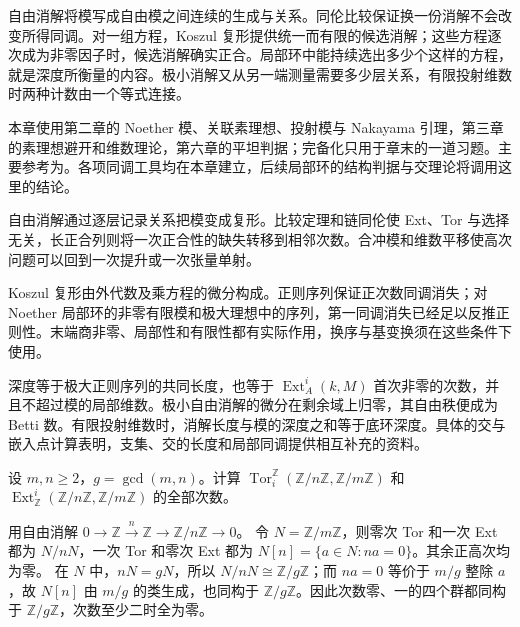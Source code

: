 \ProseParagraphBreak

自由消解将模写成自由模之间连续的生成与关系。同伦比较保证换一份消解不会改变所得同调。对一组方程，Koszul 复形提供统一而有限的候选消解；这些方程逐次成为非零因子时，候选消解确实正合。局部环中能持续选出多少个这样的方程，就是深度所衡量的内容。极小消解又从另一端测量需要多少层关系，有限投射维数时两种计数由一个等式连接。

\ProseParagraphBreak

本章使用第二章的 Noether 模、关联素理想、投射模与 Nakayama 引理，第三章的素理想避开和维数理论，第六章的平坦判据；完备化只用于章末的一道习题。主要参考为\cite[附录B，第274—280、282页；第16节；第19节，第153—155页]{Matsumura1989}。各项同调工具均在本章建立，后续局部环的结构判据与交理论将调用这里的结论。







\begin{chaptersummary}
	自由消解通过逐层记录关系把模变成复形。比较定理和链同伦使 Ext、Tor 与选择无关，长正合列则将一次正合性的缺失转移到相邻次数。合冲模和维数平移使高次问题可以回到一次提升或一次张量单射。

	\ProseParagraphBreak

	Koszul 复形由外代数及乘方程的微分构成。正则序列保证正次数同调消失；对 Noether 局部环的非零有限模和极大理想中的序列，第一同调消失已经足以反推正则性。末端商非零、局部性和有限性都有实际作用，换序与基变换须在这些条件下使用。

	\ProseParagraphBreak

	深度等于极大正则序列的共同长度，也等于 \(\operatorname{Ext}_A^i(k,M)\) 首次非零的次数，并且不超过模的局部维数。极小自由消解的微分在剩余域上归零，其自由秩便成为 Betti 数。有限投射维数时，消解长度与模的深度之和等于底环深度。具体的交与嵌入点计算表明，支集、交的长度和局部同调提供相互补充的资料。
\end{chaptersummary}

\BookExercises

\begin{exercise}\label{g5:ex:integer-tor-ext}
	设 \(m,n\geq2\)，\(g=\gcd(m,n)\)。计算
	\(\operatorname{Tor}_i^{\mathbb Z}(\mathbb Z/n\mathbb Z,\mathbb Z/m\mathbb Z)\) 和
	\(\operatorname{Ext}_{\mathbb Z}^i(\mathbb Z/n\mathbb Z,\mathbb Z/m\mathbb Z)\) 的全部次数。
\end{exercise}
\begin{solution}
	用自由消解 \(0\to\mathbb Z\xrightarrow{n}\mathbb Z\to\mathbb Z/n\mathbb Z\to0\)。
	令 \(N=\mathbb Z/m\mathbb Z\)，则零次 Tor 和一次 Ext 都为 \(N/nN\)，一次 Tor 和零次 Ext 都为 \(N[n]=\{a\in N:na=0\}\)。其余正高次均为零。
	在 \(N\) 中，\(nN=gN\)，所以 \(N/nN\cong\mathbb Z/g\mathbb Z\)；而 \(na=0\) 等价于 \(m/g\) 整除 \(a\)，故 \(N[n]\) 由 \(m/g\) 的类生成，也同构于 \(\mathbb Z/g\mathbb Z\)。因此次数零、一的四个群都同构于 \(\mathbb Z/g\mathbb Z\)，次数至少二时全为零。
\end{solution}

